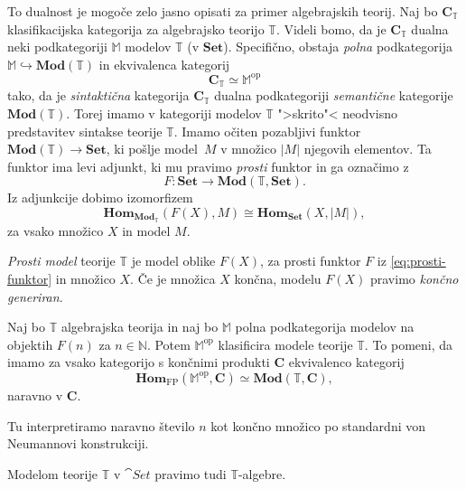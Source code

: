 \documentclass[../kategoricna_logika.tex]{subfiles}
\begin{document}
To dualnost je mogoče zelo jasno opisati za primer algebrajskih
teorij. Naj bo \(\mathbf{C}_{\mathbb{T}}\) klasifikacijska kategorija
za algebrajsko teorijo \(\mathbb{T}\). Videli bomo, da je \(\mathbf{C}_{\mathbb{T}}\)
dualna neki podkategoriji \(\mathbb{M}\) modelov \(\mathbb{T}\) (v \(\mathbf{Set}\)).
Specifično, obstaja \emph{polna} podkategorija 
\(\mathbb{\mathbb{M}} \hookrightarrow \mathbf{Mod}(\mathbb{T})\) in
ekvivalenca kategorij
\[ \mathbf{C}_{\mathbb{T}} \simeq \mathbb{M}^{\mathrm{op}} \] tako, da
je \emph{sintaktična} kategorija \(\mathbf{C}_{\mathbb{T}}\) dualna
podkategoriji \emph{semantične} kategorije
\(\mathbf{Mod}(\mathbb{T})\). Torej imamo v kategoriji modelov
\(\mathbb{T}\) ">skrito"< neodvisno predstavitev sintakse teorije
\(\mathbb{T}\). Imamo očiten pozabljivi funktor
$\mathbf{Mod}(\mathbb{T}) \to \mathbf{Set}$, ki pošlje model~$M$ v
množico $|M|$ njegovih elementov. Ta funktor
ima levi adjunkt, ki mu pravimo \emph{prosti} funktor in ga označimo z
\begin{equation}
  \label{eq:prosti-funktor}
F : \mathbf{Set} \to \mathbf{Mod}(\mathbb{T}, \mathbf{Set}).
\end{equation}
Iz adjunkcije dobimo izomorfizem
\[ \mathbf{Hom}_{\mathbf{Mod}_{\mathbb{T}}}(F(X), M) \cong
  \mathbf{Hom}_{\mathbf{Set}}(X, |M|),\] za vsako množico $X$ in model $M$.
\begin{definicija}
  \emph{Prosti model} teorije $\mathbb{T}$ je model oblike $F(X)$,
  za prosti funktor $F$ iz \eqref{eq:prosti-funktor} in množico $X$.
  Če je množica $X$ končna, modelu $F(X)$ pravimo \emph{končno generiran}.
\end{definicija}
\begin{izrek}
  Naj bo $\mathbb{T}$ algebrajska teorija in naj bo $\mathbb{M}$
  polna podkategorija modelov na objektih $F(n)$ za $n \in \mathbb{N}$.
  Potem $\mathbb{M}^{\mathrm{op}}$ klasificira modele teorije $\mathbb{T}$.
  To pomeni, da imamo za vsako kategorijo s končnimi produkti $\mathbf{C}$ ekvivalenco kategorij
  \[ \mathbf{Hom}_{\mathrm{FP}}(\mathbb{M}^{\mathrm{op}}, \mathbf{C}) \simeq \mathbf{Mod}(\mathbb{T},\mathbf{C}), \]
  naravno v $\mathbf{C}$.
\end{izrek}
\begin{opomba}
Tu interpretiramo naravno število $n$ kot končno množico po standardni von Neumannovi konstrukciji.
\end{opomba}
\begin{opomba}
  Modelom teorije $\mathbb{T}$ v $\cat{Set}$ pravimo tudi $\mathbb{T}$-algebre.
\end{opomba}
\end{document}

